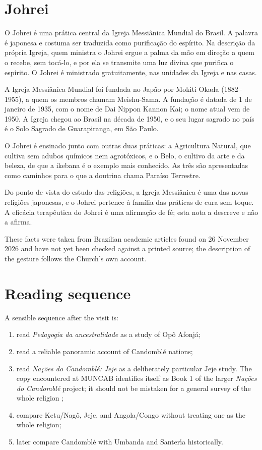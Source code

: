 \section{Johrei}
\label{section-johrei}

O Johrei é uma prática central da Igreja
Messiânica Mundial do Brasil. A palavra é
japonesa e costuma ser traduzida como
purificação do espírito. Na descrição da
própria Igreja, quem ministra o Johrei
ergue a palma da mão em direção a quem o
recebe, sem tocá-lo, e por ela se
transmite uma luz divina que purifica o
espírito. O Johrei é ministrado
gratuitamente, nas unidades da Igreja e
nas casas.

A Igreja Messiânica Mundial foi fundada no
Japão por Mokiti Okada (1882--1955), a
quem os membros chamam Meishu-Sama. A
fundação é datada de 1 de janeiro de 1935,
com o nome de Dai Nippon Kannon Kai; o nome
atual vem de 1950. A Igreja chegou ao
Brasil na década de 1950, e o seu lugar
sagrado no país é o Solo Sagrado de
Guarapiranga, em São Paulo.

O Johrei é ensinado junto com outras duas
práticas: a Agricultura Natural, que
cultiva sem adubos químicos nem
agrotóxicos, e o Belo, o cultivo da arte e
da beleza, de que a ikebana é o exemplo
mais conhecido. As três são apresentadas
como caminhos para o que a doutrina chama
Paraíso Terrestre.

Do ponto de vista do estudo das religiões,
a Igreja Messiânica é uma das novas
religiões japonesas, e o Johrei pertence à
família das práticas de cura sem toque. A
eficácia terapêutica do Johrei é uma
afirmação de fé; esta nota a descreve e
não a afirma.

These facts were taken from Brazilian
academic articles found on 26 November
2026 and have not yet been checked against
a printed source; the description of the
gesture follows the Church's own account.

\section{Reading sequence}
\label{religion-section-religion-reading}

A sensible sequence after the visit is:

\begin{enumerate}
\item read
\emph{Pedagogia da ancestralidade}
as a study of Op\^o Afonj\'a;
\item read a reliable panoramic account of
Candombl\'e nations;
\item read
\emph{Na\c{c}\~oes do Candombl\'e: Jeje}
as a deliberately particular Jeje study.
The copy encountered at MUNCAB identifies
itself as Book 1 of the larger
\emph{Na\c{c}\~oes do Candombl\'e}
project; it should not be mistaken for a
general survey of the whole religion
\cite{ufrb2026nacoes};
\item compare Ketu/Nag\^o, Jeje, and
Angola/Congo without treating one as the
whole religion;
\item later compare Candombl\'e with Umbanda
and Santer\'\i a historically.
\end{enumerate}





